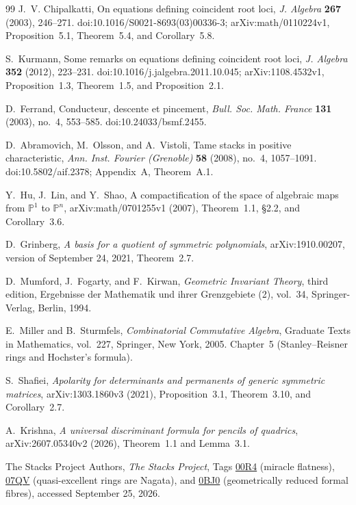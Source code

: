 \documentclass[11pt,reqno]{amsart}
\numberwithin{equation}{section}
\theoremstyle{definition}\newtheorem{definition}[theorem]{Definition}
\theoremstyle{remark}\newtheorem{remark}[theorem]{Remark}
\newcommand{\Pj}{\mathbb P}\newcommand{\A}{\mathbb A}
\begin{document}
\begin{thebibliography}{99}
J.~V. Chipalkatti, On equations defining coincident root loci,
\emph{J. Algebra} \textbf{267} (2003), 246--271.
doi:10.1016/S0021-8693(03)00336-3;
arXiv:math/0110224v1, Proposition~5.1, Theorem~5.4,
and Corollary~5.8.

S.~Kurmann, Some remarks on equations defining coincident root loci,
\emph{J. Algebra} \textbf{352} (2012), 223--231.
doi:10.1016/j.jalgebra.2011.10.045;
arXiv:1108.4532v1, Proposition~1.3, Theorem~1.5,
and Proposition~2.1.

D.~Ferrand, Conducteur, descente et pincement,
\emph{Bull. Soc. Math. France} \textbf{131} (2003), no.~4, 553--585.
doi:10.24033/bsmf.2455.

D.~Abramovich, M.~Olsson, and A.~Vistoli, Tame stacks in positive
characteristic, \emph{Ann. Inst. Fourier (Grenoble)}
\textbf{58} (2008), no.~4, 1057--1091.
doi:10.5802/aif.2378; Appendix~A, Theorem~A.1.

Y.~Hu, J.~Lin, and Y.~Shao, A compactification of the space of
algebraic maps from $\Pj^1$ to $\Pj^n$,
arXiv:math/0701255v1 (2007), Theorem~1.1,
\S2.2, and Corollary~3.6.


D.~Grinberg, \emph{A basis for a quotient of symmetric polynomials},
arXiv:1910.00207, version of September 24, 2021, Theorem~2.7.

D.~Mumford, J.~Fogarty, and F.~Kirwan,
\emph{Geometric Invariant Theory}, third edition,
Ergebnisse der Mathematik und ihrer Grenzgebiete (2), vol.~34,
Springer-Verlag, Berlin, 1994.

E.~Miller and B.~Sturmfels, \emph{Combinatorial Commutative Algebra},
Graduate Texts in Mathematics, vol.~227, Springer, New York, 2005.
Chapter~5 (Stanley--Reisner rings and Hochster's formula).

S.~Shafiei, \emph{Apolarity for determinants and permanents of generic
symmetric matrices}, arXiv:1303.1860v3 (2021), Proposition~3.1,
Theorem~3.10, and Corollary~2.7.

A.~Krishna, \emph{A universal discriminant formula for pencils of
quadrics}, arXiv:2607.05340v2 (2026), Theorem~1.1 and Lemma~3.1.

The Stacks Project Authors, \emph{The Stacks Project},
Tags \href{https://stacks.math.columbia.edu/tag/00R4}{00R4}
(miracle flatness),
\href{https://stacks.math.columbia.edu/tag/07QV}{07QV}
(quasi-excellent rings are Nagata), and
\href{https://stacks.math.columbia.edu/tag/0BJ0}{0BJ0}
(geometrically reduced formal fibres), accessed September 25, 2026.


\end{thebibliography}
\end{document}
